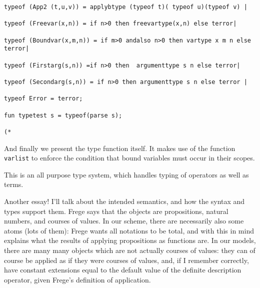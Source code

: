 \documentclass{article}
\begin{document}
{{\begin{verbatim}
typeof (App2 (t,u,v)) = applybtype (typeof t)( typeof u)(typeof v) |

typeof (Freevar(x,n)) = if n>0 then freevartype(x,n) else terror|

typeof (Boundvar(x,m,n)) = if m>0 andalso n>0 then vartype x m n else terror|

typeof (Firstarg(s,n)) =if n>0 then  argumenttype s n else terror|

typeof (Secondarg(s,n)) = if n>0 then argumenttype s n else terror |

typeof Error = terror;

fun typetest s = typeof(parse s);

(*

\end{verbatim}

And finally we present the type function itself.  It makes use of the function {\tt varlist} to enforce the condition that bound variables must occur in their scopes.

This is an all purpose type system, which handles typing of operators as well as terms.

Another essay!  I'll talk about the intended semantics, and how the syntax and types support them.  Frege says that the objects are propositions, natural numbers, and courses of values.  In our scheme, there are necessarily also some atoms (lots of them):  Frege wants all notations to be total, and with this in mind explains what the results of applying propositions as functions are.  In our models, there are many many objects which are not actually courses of values:  they can of course be applied as if they were courses of values, and, if I remember correctly, have constant extensions equal to the default value of the definite description operator, given Frege's definition of application.

}}
\end{document}
